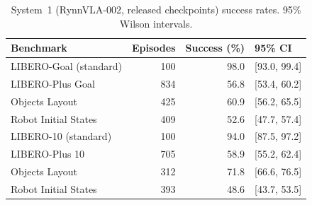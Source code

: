 \begin{table}[t]
\centering
\caption{System~1 (RynnVLA-002, released checkpoints) success rates. 95\% Wilson intervals.}
\label{tab:baseline}
\small
\begin{tabular}{lrrl}
\toprule
Benchmark & Episodes & Success (\%) & 95\% CI \\
\midrule
LIBERO-Goal (standard) & 100 & 98.0 & [93.0, 99.4] \\
LIBERO-Plus Goal & 834 & 56.8 & [53.4, 60.2] \\
\quad Objects Layout & 425 & 60.9 & [56.2, 65.5] \\
\quad Robot Initial States & 409 & 52.6 & [47.7, 57.4] \\
LIBERO-10 (standard) & 100 & 94.0 & [87.5, 97.2] \\
LIBERO-Plus 10 & 705 & 58.9 & [55.2, 62.4] \\
\quad Objects Layout & 312 & 71.8 & [66.6, 76.5] \\
\quad Robot Initial States & 393 & 48.6 & [43.7, 53.5] \\
\bottomrule
\end{tabular}
\end{table}
